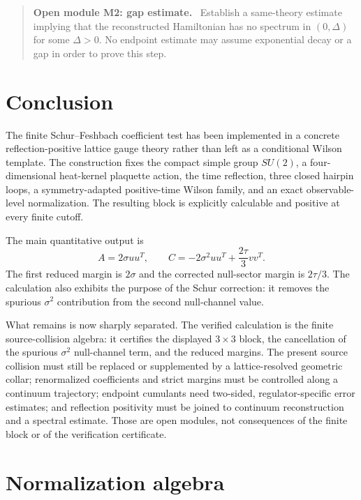 \documentclass[11pt]{article}
\newenvironment{openmodule}[1]
{\begin{quote}\color{red!55!black}\textbf{Open module #1.}\ }
{\end{quote}}
\begin{document}
\begin{openmodule}{M2: gap estimate}
Establish a same-theory estimate implying that the reconstructed Hamiltonian has no spectrum in $(0,\Delta)$ for some $\Delta>0$.  No endpoint estimate may assume exponential decay or a gap in order to prove this step.
\end{openmodule}

\section{Conclusion}

The finite Schur--Feshbach coefficient test has been implemented in a concrete reflection-positive lattice gauge theory rather than left as a conditional Wilson template.  The construction fixes the compact simple group $SU(2)$, a four-dimensional heat-kernel plaquette action, the time reflection, three closed hairpin loops, a symmetry-adapted positive-time Wilson family, and an exact observable-level normalization.  The resulting block is explicitly calculable and positive at every finite cutoff.

The main quantitative output is
\[
  A=2\sigma uu^T,
  \qquad
  C=-2\sigma^2uu^T+\frac{2\tau}{3}vv^T.
\]
The first reduced margin is $2\sigma$ and the corrected null-sector margin is $2\tau/3$.  The calculation also exhibits the purpose of the Schur correction: it removes the spurious $\sigma^2$ contribution from the second null-channel value.

What remains is now sharply separated.  The verified calculation is the finite source-collision algebra: it certifies the displayed $3\times3$ block, the cancellation of the spurious $\sigma^2$ null-channel term, and the reduced margins.  The present source collision must still be replaced or supplemented by a lattice-resolved geometric collar; renormalized coefficients and strict margins must be controlled along a continuum trajectory; endpoint cumulants need two-sided, regulator-specific error estimates; and reflection positivity must be joined to continuum reconstruction and a spectral estimate.  Those are open modules, not consequences of the finite block or of the verification certificate.

\appendix

\section{Normalization algebra}
\label{app:normalization}
\end{document}
